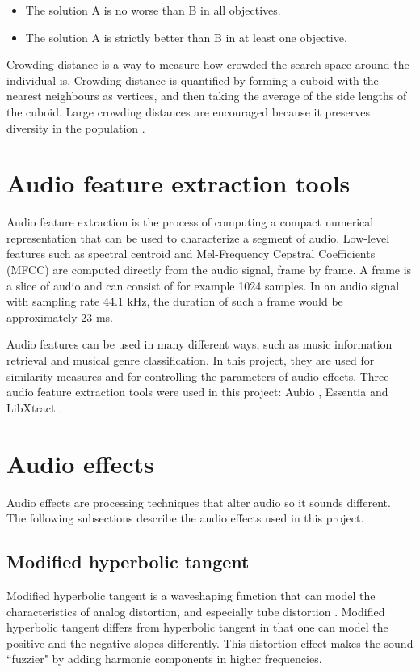 \begin{itemize}  
\item The solution A is no worse than B in all objectives.
\item The solution A is strictly better than B in at least one objective.
\end{itemize}

Crowding distance is a way to measure how crowded the search space around the individual is. Crowding distance is quantified by forming a cuboid with the nearest neighbours as vertices, and then taking the average of the side lengths of the cuboid. Large crowding distances are encouraged because it preserves diversity in the population \citep{nsga2}.

\section{Audio feature extraction tools}
Audio feature extraction is the process of computing a compact numerical representation that can be used to characterize a segment of audio. Low-level features such as spectral centroid and Mel-Frequency Cepstral Coefficients (MFCC) \citep{mermelstein1976, logan2000} are computed directly from the audio signal, frame by frame. A frame is a slice of audio and can consist of for example 1024 samples. In an audio signal with sampling rate 44.1 kHz, the duration of such a frame would be approximately 23 ms.

Audio features can be used in many different ways, such as music information retrieval and musical genre classification. In this project, they are used for similarity measures and for controlling the parameters of audio effects. Three audio feature extraction tools were used in this project: Aubio \citep{brossier2003aubio}, Essentia \citep{bogdanov2013essentia} and LibXtract \citep{bullock2007libxtract}.

\section{Audio effects}
Audio effects are processing techniques that alter audio so it sounds different. The following subsections describe the audio effects used in this project.

\subsection{Modified hyperbolic tangent}
Modified hyperbolic tangent is a waveshaping function that can model the characteristics of analog distortion, and especially tube distortion \citep{mtanh}. Modified hyperbolic tangent differs from hyperbolic tangent in that one can model the positive and the negative slopes differently. This distortion effect makes the sound ``fuzzier" by adding harmonic components in higher frequencies.

